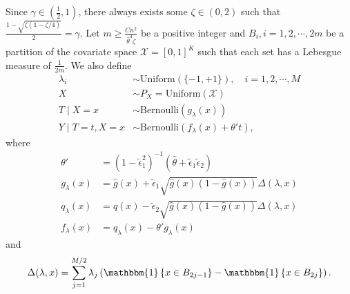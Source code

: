 \documentclass{article}
\def\eps{{\epsilon}}
\def\gX{{\mathcal{X}}}
\begin{document}
Since $\gamma\in\left(\frac{1}{2},1\right)$, there always exists some $\zeta\in(0,2)$ such that $\frac{1-\sqrt{\zeta(1-\zeta / 4)}}{2}=\gamma$. Let $m \geq \frac{Cn^2}{\hat{\theta}^4\zeta}$ be a positive integer and $B_i, i=1,2,\cdots, 2m$ be a partition of the covariate space $\gX=[0,1]^{K}$ such that each set has a Lebesgue measure of $\frac{1}{2m}$. We also define
\begin{equation}
    \label{eq:perturbed-dgp-binary-case}
    \begin{aligned}
        \lambda_i &\sim \mathrm{Uniform}(\{-1,+1\}),\quad i=1,2,\cdots,M \\
        X &\sim P_X=\mathrm{Uniform}(\gX) \\
        T\mid X=x &\sim \mathrm{Bernoulli}(g_{\lambda}(x)) \\
        Y\mid T=t, X=x &\sim \mathrm{Bernoulli}(f_{\lambda}(x)+\theta't),
    \end{aligned}
\end{equation}
where
\begin{equation}
    \label{eq:def-binary-perturbed-nuisance}
    \begin{aligned}
        \theta' &= (1-\tilde{\eps}_1^2)^{-1}(\hat{\theta}+\tilde{\eps}_1\tilde{\eps}_2) \\
        g_{\lambda}(x) &= \hat{g}(x) + \tilde{\eps}_1\sqrt{\hat{g}(x)(1-\hat{g}(x))}\Delta(\lambda,x) \\
        q_{\lambda}(x) &= \hat{q}(x) - \tilde{\eps}_2\sqrt{\hat{g}(x)(1-\hat{g}(x))}\Delta(\lambda,x) \\
        f_{\lambda}(x) &= q_{\lambda}(x)-\theta'g_{\lambda}(x)
    \end{aligned}
\end{equation}
and
\begin{equation}
    \notag
    \Delta(\lambda,x) = \sum_{j=1}^{M/2}\lambda_j\left(\mathbbm{1}\left\{x\in B_{2j-1}\right\} - \mathbbm{1}\left\{x\in B_{2j}\right\}\right).
\end{equation}
\end{document}
